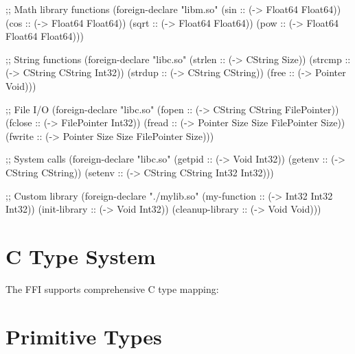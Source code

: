 \begin{example}
\begin{lambdustcode}
;; Math library functions
(foreign-declare "libm.so"
  (sin :: (-> Float64 Float64))
  (cos :: (-> Float64 Float64))
  (sqrt :: (-> Float64 Float64))
  (pow :: (-> Float64 Float64 Float64)))

;; String functions
(foreign-declare "libc.so" 
  (strlen :: (-> CString Size))
  (strcmp :: (-> CString CString Int32))
  (strdup :: (-> CString CString))
  (free :: (-> Pointer Void)))

;; File I/O
(foreign-declare "libc.so"
  (fopen :: (-> CString CString FilePointer))
  (fclose :: (-> FilePointer Int32))  
  (fread :: (-> Pointer Size Size FilePointer Size))
  (fwrite :: (-> Pointer Size Size FilePointer Size)))

;; System calls
(foreign-declare "libc.so"
  (getpid :: (-> Void Int32))
  (getenv :: (-> CString CString))
  (setenv :: (-> CString CString Int32 Int32)))

;; Custom library
(foreign-declare "./mylib.so"
  (my-function :: (-> Int32 Int32 Int32))
  (init-library :: (-> Void Int32))
  (cleanup-library :: (-> Void Void)))
\end{lambdustcode}
\end{example}

\section{C Type System}
\label{sec:c-types}


The FFI supports comprehensive C type mapping:

\section{Primitive Types}
\label{sec:primitive-c-types}

